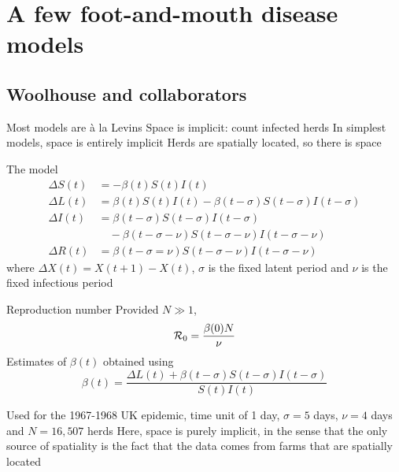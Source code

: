 \documentclass[aspectratio=43]{beamer}
\begin{document}
\section{A few foot-and-mouth disease models}

\subsection{Woolhouse and collaborators}
\begin{frame}{Most models are \`a la Levins}
    Space is implicit: count infected herds
	\vfill
	In simplest models, space is entirely implicit
	\vfill
	Herds are spatially located, so there is space
\end{frame}


\begin{frame}{The model}
	\begin{subequations}
		\begin{align}
			\Delta S(t) &= -\beta(t)S(t)I(t) \\
			\Delta L(t) &= \beta(t)S(t)I(t) -\beta(t-\sigma)S(t-\sigma)I(t-\sigma) \\
			\Delta I(t) &= \beta(t-\sigma)S(t-\sigma)I(t-\sigma) \nonumber \\
			&\quad -\beta(t-\sigma-\nu)S(t-\sigma-\nu)I(t-\sigma-\nu) \\
			\Delta R(t) &= \beta(t-\sigma=\nu)S(t-\sigma-\nu)I(t-\sigma-\nu)
		\end{align}
	\end{subequations}
	where $\Delta X(t)=X(t+1)-X(t)$, $\sigma$ is the fixed latent period and $\nu$ is the fixed infectious period
\end{frame}

\begin{frame}{Reproduction number}
	Provided $N\gg 1$, 
	\[
		\mathcal{R}_0=\frac{\beta(0)N}{\nu}
	\]
	\vfill
	Estimates of $\beta(t)$ obtained using
	\[
		\beta(t)=\frac{\Delta L(t)+\beta(t-\sigma)S(t-\sigma)I(t-\sigma)}{S(t)I(t)}
	\]
\end{frame}

\begin{frame}
	Used for the 1967-1968 UK epidemic, time unit of 1 day, $\sigma=5$ days, $\nu=4$ days and $N=16,507$ herds
	\vfill
	Here, space is purely implicit, in the sense that the only source of spatiality is the fact that the data comes from farms that are spatially located
\end{frame}
\end{document}
